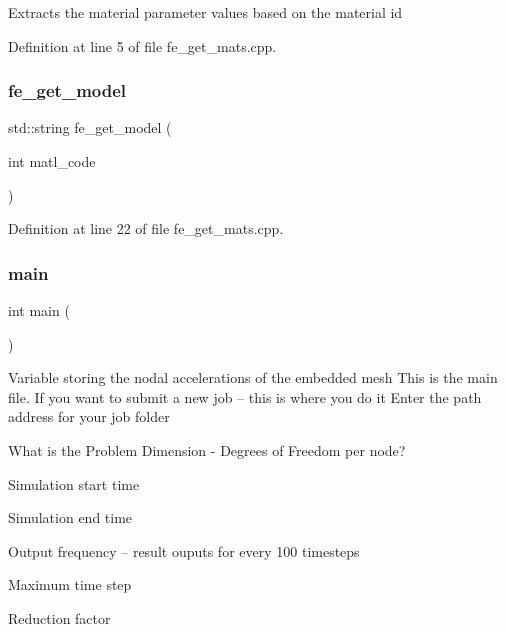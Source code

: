 Extracts the material parameter values based on the material id 

Definition at line 5 of file fe\+\_\+get\+\_\+mats.\+cpp.

\mbox{\label{class_materials_a34d6fb85943d945b7e8600d2ef4220d0}} 
\subsubsection{\texorpdfstring{fe\+\_\+get\+\_\+model}{fe\_get\_model}}
{\footnotesize\ttfamily std\+::string fe\+\_\+get\+\_\+model (\begin{DoxyParamCaption}\item[{int}]{matl\+\_\+code }\end{DoxyParamCaption})\hspace{0.3cm}{\ttfamily [friend]}}



Definition at line 22 of file fe\+\_\+get\+\_\+mats.\+cpp.

\mbox{\label{class_materials_ae66f6b31b5ad750f1fe042a706a4e3d4}} 
\subsubsection{\texorpdfstring{main}{main}}
{\footnotesize\ttfamily int main (\begin{DoxyParamCaption}{ }\end{DoxyParamCaption})\hspace{0.3cm}{\ttfamily [friend]}}

Variable storing the nodal accelerations of the embedded mesh This is the main file. If you want to submit a new job -- this is where you do it Enter the path address for your job folder

What is the Problem Dimension -\/ Degrees of Freedom per node?

Simulation start time

Simulation end time

Output frequency -- result ouputs for every 100 timesteps

Maximum time step

Reduction factor

